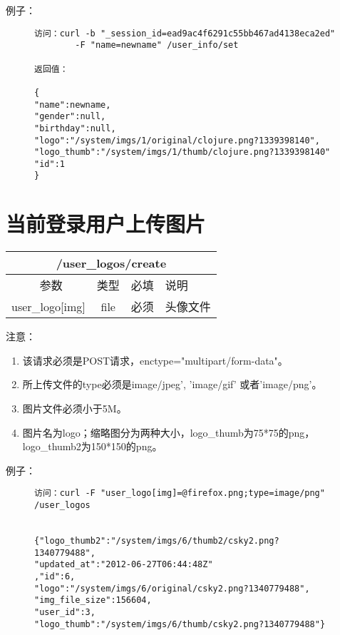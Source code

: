 \documentclass[cs4size]{ctexartutf8}
\begin{document}
例子：

\begin{figure}[H]
\begin{verbatim}
访问：curl -b "_session_id=ead9ac4f6291c55bb467ad4138eca2ed" 
        -F "name=newname" /user_info/set

返回值：

{
"name":newname,
"gender":null,
"birthday":null,
"logo":"/system/imgs/1/original/clojure.png?1339398140",
"logo_thumb":"/system/imgs/1/thumb/clojure.png?1339398140"
"id":1
}

\end{verbatim}
\end{figure}


\section{当前登录用户上传图片}

\begin{table}[H]
   \begin{center}
\begin{tabular}{|c|c|c|p{12cm}|}
\hline
\multicolumn{4}{|c|}{/user\_logos/create} \\
\hline\hline
 \  参数  & 类型 & 必填 &  说明  \\
\hline
 user\_logo[img]  & file & 必须 &  头像文件\\
\hline
\end{tabular}
   \end{center}
\end{table}

注意：

\begin{enumerate}
\item 该请求必须是POST请求，enctype="multipart/form-data"。
\item 所上传文件的type必须是image/jpeg', 'image/gif' 或者'image/png'。
\item 图片文件必须小于5M。
\item 图片名为logo；缩略图分为两种大小，logo\_thumb为75*75的png，logo\_thumb2为150*150的png。
\end{enumerate}

例子：

\begin{figure}[H]
\begin{verbatim}
访问：curl -F "user_logo[img]=@firefox.png;type=image/png" 
/user_logos


{"logo_thumb2":"/system/imgs/6/thumb2/csky2.png?1340779488",
"updated_at":"2012-06-27T06:44:48Z"
,"id":6,
"logo":"/system/imgs/6/original/csky2.png?1340779488",
"img_file_size":156604,
"user_id":3,
"logo_thumb":"/system/imgs/6/thumb/csky2.png?1340779488"}

\end{verbatim}
\end{figure}
\end{document}

